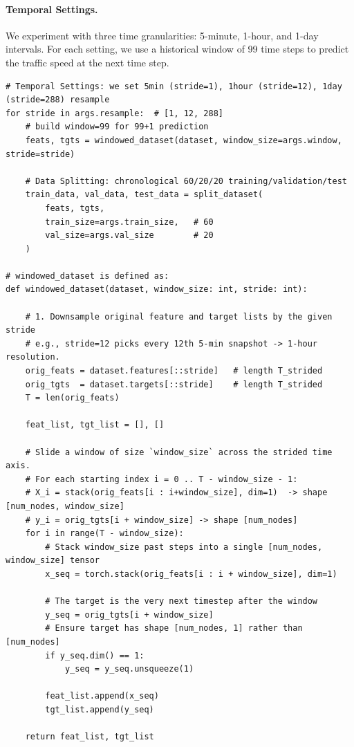 \documentclass[runningheads]{llncs}
\begin{document}
\paragraph{Temporal Settings.}
We experiment with three time granularities: 5-minute, 1-hour, and 1-day intervals. For each setting, we use a historical window of 99 time steps to predict the traffic speed at the next time step.
\begin{lstlisting}[style=customPython]
# Temporal Settings: we set 5min (stride=1), 1hour (stride=12), 1day (stride=288) resample 
for stride in args.resample:  # [1, 12, 288]
    # build window=99 for 99+1 prediction
    feats, tgts = windowed_dataset(dataset, window_size=args.window, stride=stride)

    # Data Splitting: chronological 60/20/20 training/validation/test
    train_data, val_data, test_data = split_dataset(
        feats, tgts,
        train_size=args.train_size,   # 60
        val_size=args.val_size        # 20
    )

# windowed_dataset is defined as:
def windowed_dataset(dataset, window_size: int, stride: int):

    # 1. Downsample original feature and target lists by the given stride
    # e.g., stride=12 picks every 12th 5-min snapshot -> 1-hour resolution.
    orig_feats = dataset.features[::stride]   # length T_strided
    orig_tgts  = dataset.targets[::stride]    # length T_strided
    T = len(orig_feats)                     

    feat_list, tgt_list = [], []

    # Slide a window of size `window_size` across the strided time axis.
    # For each starting index i = 0 .. T - window_size - 1:
    # X_i = stack(orig_feats[i : i+window_size], dim=1)  -> shape [num_nodes, window_size]
    # y_i = orig_tgts[i + window_size] -> shape [num_nodes]
    for i in range(T - window_size):
        # Stack window_size past steps into a single [num_nodes, window_size] tensor
        x_seq = torch.stack(orig_feats[i : i + window_size], dim=1)

        # The target is the very next timestep after the window
        y_seq = orig_tgts[i + window_size]
        # Ensure target has shape [num_nodes, 1] rather than [num_nodes]
        if y_seq.dim() == 1:
            y_seq = y_seq.unsqueeze(1)

        feat_list.append(x_seq)
        tgt_list.append(y_seq)

    return feat_list, tgt_list

\end{lstlisting}
\end{document}
